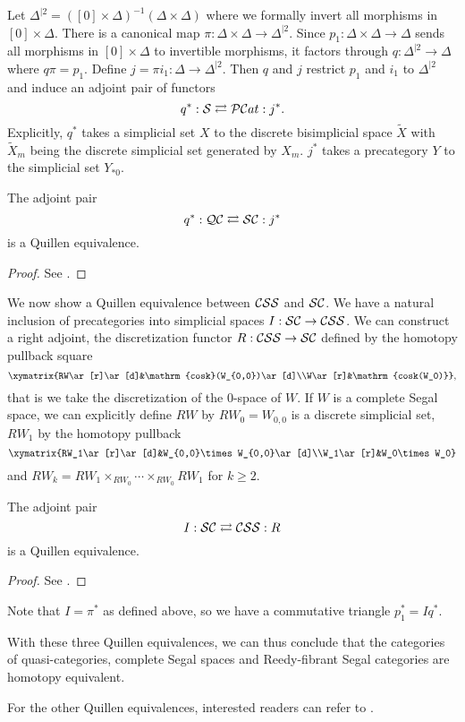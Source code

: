 Let $\Delta^{|2}=([0]\times\Delta)^{-1}(\Delta\times\Delta)$ where we formally invert all morphisms in $[0]\times\Delta$. There is a canonical map $\pi:\Delta\times\Delta\to\Delta^{|2}$. Since $p_1:\Delta\times\Delta\to\Delta$ sends all morphisms in $[0]\times\Delta$ to invertible morphisms, it factors through $q:\Delta^{|2}\to\Delta$ where $q\pi=p_1$. Define $j=\pi i_1:\Delta\to\Delta^{|2}$. Then $q$ and $j$ restrict $p_1$ and $i_1$ to $\Delta^{|2}$ and induce an adjoint pair of functors
$$q^*:\mathcal S\rightleftarrows{\cal PC}at:j^*.$$
Explicitly, $q^*$ takes a simplicial set $X$ to the discrete bisimplicial space $\tilde X$ with $\tilde X_m$ being the discrete simplicial set generated by $X_m$. $j^*$ takes a precategory $Y$ to the simplicial set $Y_{*0}$.

\begin{thm}
The adjoint pair
$$q^*:{\cal QC}\rightleftarrows{\cal SC}:j^*$$
is a Quillen equivalence.
\end{thm}
\begin{proof}
See \cite{jt}.
\end{proof}

We now show a Quillen equivalence between ${\cal CSS}$ and ${\cal SC}$. We have a natural inclusion of precategories into simplicial spaces $I:{\cal SC}\to{\cal CSS}$. We can construct a right adjoint, the discretization functor $R:{\cal CSS}\to{\cal SC}$ defined by the homotopy pullback square
$$\xymatrix{RW\ar[r]\ar[d]&\mathrm{cosk}(W_{0,0})\ar[d]\\W\ar[r]&\mathrm{cosk(W_0)}},$$
that is we take the discretization of the 0-space of $W$. If $W$ is a complete Segal space, we can explicitly define $RW$ by $RW_0=W_{0,0}$ is a discrete simplicial set, $RW_1$ by the homotopy pullback
$$\xymatrix{RW_1\ar[r]\ar[d]&W_{0,0}\times W_{0,0}\ar[d]\\W_1\ar[r]&W_0\times W_0}$$
and $RW_k=RW_1\times_{RW_0}\cdots\times_{RW_0}RW_1$ for $k\ge2$.

\begin{thm}
The adjoint pair
$$I:{\cal SC}\rightleftarrows{\cal CSS}:R$$
is a Quillen equivalence.
\end{thm}

\begin{proof}
See \cite{bergner3}.
\end{proof}

Note that $I=\pi^*$ as defined above, so we have a commutative triangle $p_1^*=Iq^*$.

With these three Quillen equivalences, we can thus conclude that the categories of quasi-categories, complete Segal spaces and Reedy-fibrant Segal categories are homotopy equivalent.

For the other Quillen equivalences, interested readers can refer to \cite{hs}.



%
%

%
